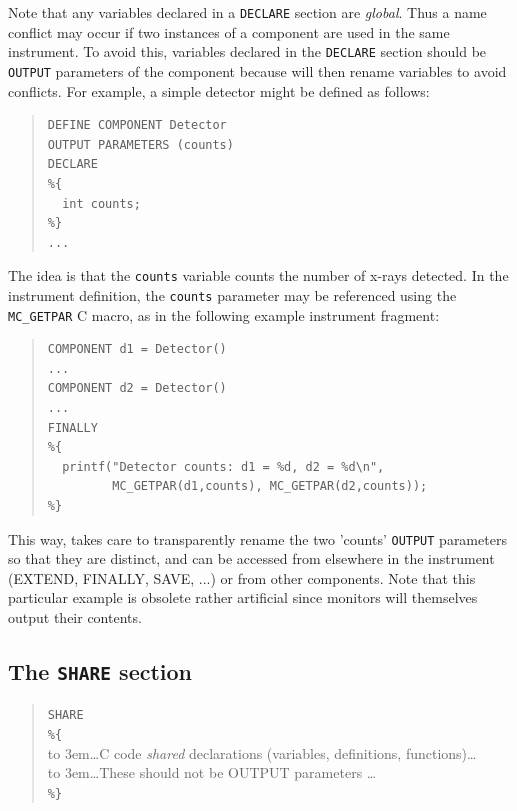Note that any variables declared in a \verb+DECLARE+ section are
\emph{global}. Thus a name conflict may occur if two instances of a
component are used in the same instrument. To avoid this, variables
declared in the \texttt{DECLARE} section should be \texttt{OUTPUT} parameters of
the component because \MCX will then rename variables to avoid conflicts.
For example, a simple detector might be defined as follows:
\begin{quote}
\begin{verbatim}
DEFINE COMPONENT Detector
OUTPUT PARAMETERS (counts)
DECLARE
%{
  int counts;
%}
...
\end{verbatim}
\end{quote}
The idea is that the \texttt{counts} variable counts the number of
x-rays detected. In the instrument definition, the \texttt{counts}
parameter may be referenced using the \verb+MC_GETPAR+ C macro, as in
the following example instrument fragment:\label{mcgetpar}
\begin{quote}
\begin{verbatim}
COMPONENT d1 = Detector()
...
COMPONENT d2 = Detector()
...
FINALLY
%{
  printf("Detector counts: d1 = %d, d2 = %d\n",
         MC_GETPAR(d1,counts), MC_GETPAR(d2,counts));
%}
\end{verbatim}
\end{quote}
This way, \MCX takes care to transparently rename the two 'counts'
\texttt{OUTPUT} parameters so that they are distinct, and can be
accessed from elsewhere in the instrument (EXTEND, FINALLY, SAVE, ...)
or from other components. Note that this particular example is obsolete rather artificial since
\MCX monitors will themselves output their contents.

\subsection{The \texttt{SHARE} section}
\label{s:comp-share}
\begin{quote}
  \texttt{SHARE} \\
  \verb|%{| \\
  \hbox to 3em{}\ldots C code \emph{shared} declarations (variables, definitions, functions)\ldots \\
  \hbox to 3em{}\ldots These should not be OUTPUT parameters \ldots \\
  \verb|%}|
\end{quote}

